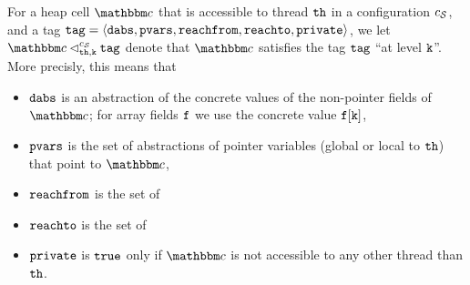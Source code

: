 For a heap cell $\cell$ that is accessible to thread ${\tt th}$ 
in a configuration $c_{\mathcal S}$, and a tag $\mathtt{tag} = \left\langle\mathtt{dabs},\mathtt{pvars},\mathtt{reachfrom},\mathtt{reachto},\mathtt{private}\right\rangle$,
we let $\cell \lsatfrag{\klevel}{\thread}{\sconf} \atag$ denote that
$\cell$ satisfies the tag $\mathtt{tag}$ ``at level ${\tt k}$''.
More precisly, this means that
\begin{itemize}
\item
  $\mathtt{dabs}$ is an abstraction of the concrete values of the non-pointer fields of $\cell$; for array fields $\tt f$ we use the concrete value $\tt f[k]$,
\item
  $\mathtt{pvars}$ is the set of abstractions of pointer variables (global or
  local to ${\tt th}$) that point to $\cell$,
\item
  $\mathtt{reachfrom}$ is the set of
\item
  $\mathtt{reachto}$ is the set of
\item
  $\mathtt{private}$ is ${\tt true}$ only if $\cell$ is 
not accessible to any other thread than ${\tt th}$.
\end{itemize}
